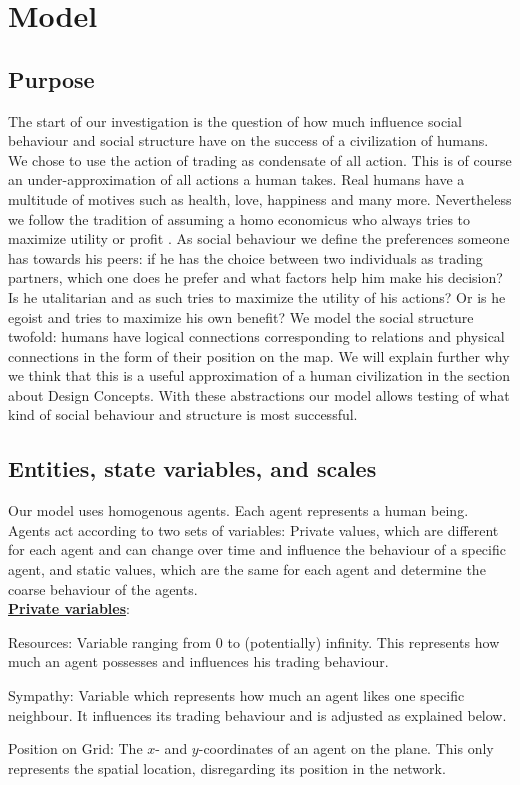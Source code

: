 \documentclass{JASSS}
\begin{document}
\section{Model}
\subsection{Purpose}
The start of our investigation is the question of how much influence social behaviour and social structure have on the success of a civilization of humans. We chose to use the action of trading as condensate of all action. This is of course an under-approximation of all actions a human takes. Real humans have a multitude of motives such as health, love, happiness and many more. Nevertheless we follow the tradition of assuming a homo economicus who always tries to maximize utility or profit \citep{rittenberg}. As social behaviour we define the preferences someone has towards his peers: if he has the choice between two individuals as trading partners, which one does he prefer and what factors help him make his decision? Is he utalitarian and as such tries to maximize the utility of his actions? Or is he egoist and tries to maximize his own benefit? We model the social structure twofold: humans have logical connections corresponding to relations and physical connections in the form of their position on the map. We will explain further why we think that this is a useful approximation of a human civilization in the section about Design Concepts. With these abstractions our model allows testing of what kind of social behaviour and structure is most successful.


\subsection{Entities, state variables, and scales}
Our model uses homogenous agents. Each agent represents a human being. Agents act according to two sets of variables: Private values, which are different for each agent and can change over time and influence the behaviour of a specific agent, and static values, which are the same for each agent and determine the coarse behaviour of the agents.\\

\textbf{\underline{Private variables}}:
\begin{description*}
	\item[Resources:]
		Variable ranging from 0 to (potentially) infinity. This represents how much an agent possesses and influences his trading behaviour.

	\item[Sympathy:]
		Variable which represents how much an agent likes one specific neighbour. It influences its trading behaviour and is adjusted as explained below.

	\item[Position on Grid:]
		The $x$- and $y$-coordinates of an agent on the plane. This only represents the spatial location, disregarding its position in the network.
\end{description*}
\end{document}
